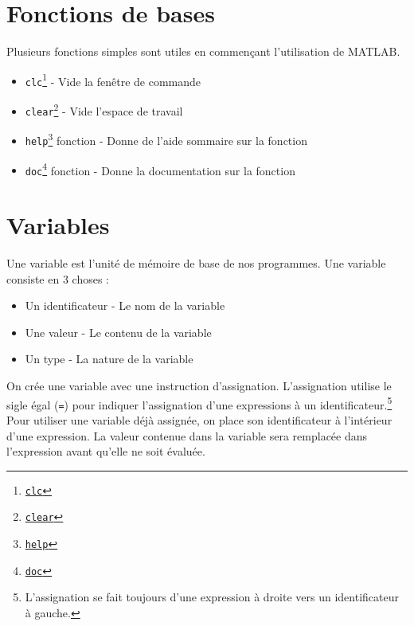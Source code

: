 \documentclass[]{tufte-handout}
\newcommand{\passthrough}[1]{#1}
\providecommand{\tightlist}{%
  \setlength{\itemsep}{0pt}\setlength{\parskip}{0pt}}
\begin{document}
\hypertarget{fonctions-de-bases}{%
\section{Fonctions de bases}\label{fonctions-de-bases}}

Plusieurs fonctions simples sont utiles en commençant l'utilisation de
MATLAB.

\begin{itemize}
\tightlist
\item
  \passthrough{\lstinline!clc!}\footnote{\href{https://www.mathworks.com/help/matlab/ref/clc.html}{\passthrough{\lstinline!clc!}}}
  - Vide la fenêtre de commande
\item
  \passthrough{\lstinline!clear!}\footnote{\href{https://www.mathworks.com/help/matlab/ref/clear.html}{\passthrough{\lstinline!clear!}}}
  - Vide l'espace de travail
\item
  \passthrough{\lstinline!help!}\footnote{\href{https://www.mathworks.com/help/matlab/ref/help.html}{\passthrough{\lstinline!help!}}}
  fonction - Donne de l'aide sommaire sur la fonction
\item
  \passthrough{\lstinline!doc!}\footnote{\href{https://www.mathworks.com/help/matlab/ref/doc.html}{\passthrough{\lstinline!doc!}}}
  fonction - Donne la documentation sur la fonction
\end{itemize}

\hypertarget{variables}{%
\section{Variables}\label{variables}}

Une variable est l'unité de mémoire de base de nos programmes. Une
variable consiste en 3 choses :

\begin{itemize}
\tightlist
\item
  Un identificateur - Le nom de la variable
\item
  Une valeur - Le contenu de la variable
\item
  Un type - La nature de la variable
\end{itemize}

On crée une variable avec une instruction d'assignation. L'assignation
utilise le sigle égal (\passthrough{\lstinline!=!}) pour indiquer
l'assignation d'une expressions à un identificateur.\footnote{L'assignation
  se fait toujours d'une expression à droite vers un identificateur à
  gauche.} Pour utiliser une variable déjà assignée, on place son
identificateur à l'intérieur d'une expression. La valeur contenue dans
la variable sera remplacée dans l'expression avant qu'elle ne soit
évaluée.
\end{document}
